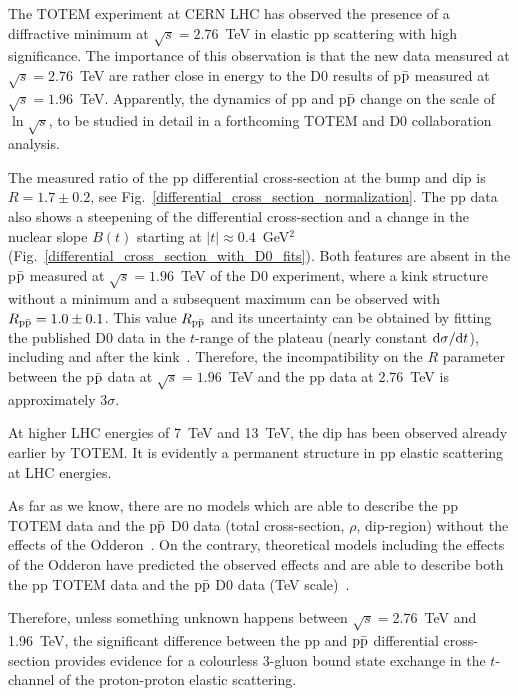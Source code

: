 \documentclass[TOTEM]{cernphprep}
\begin{document}
The TOTEM experiment at CERN LHC has observed the presence of a diffractive minimum at $\sqrt{s}=2.76$~TeV in elastic pp scattering with high significance. The importance of this observation is that the new data measured at $\sqrt{s}=2.76$~TeV
are rather close in energy to the D0 results of p$\bar{\rm p}$ measured at $\sqrt{s}=1.96$~TeV. Apparently, the dynamics of pp and p$\rm\bar{p}$ change on the scale of $\ln{\sqrt{s}}$, to be studied in detail in
a forthcoming TOTEM and D0 collaboration analysis. 

The measured ratio of the pp differential cross-section at the bump and dip is $R=1.7 \pm 0.2$, see Fig.~\ref{differential_cross_section_normalization}. The pp data also shows a steepening of the differential
cross-section and a change in the nuclear slope $B(t)$ starting at $|t|\approx0.4$~GeV$^{2}$ (Fig.~\ref{differential_cross_section_with_D0_fits}). Both features are 
absent in the p$\bar{\rm p}$ measured at $\sqrt{s}=1.96$~TeV of the D0 experiment, where a kink structure without a minimum and a subsequent maximum can be observed with $R_{\rm p\bar{p}}=1.0\pm 0.1$. This value $R_{\rm p\bar{p}}$ and its uncertainty
can be obtained by fitting the published D0 data in the $t$-range of the plateau (nearly constant ${\rm d}\sigma/{\rm d}t$), including and after the kink~\cite{Abazov:2012qb}. Therefore, the incompatibility on the $R$ parameter between the p$\bar{\rm p}$ data at $\sqrt{s}=1.96$~TeV
and the pp data at 2.76~TeV is approximately 3$\sigma$.


At higher LHC energies of 7~TeV and 13~TeV, the dip has been observed already earlier by TOTEM. It is evidently a permanent structure in pp elastic scattering 
at LHC energies.

As far as we know, there are no models which are able to describe the pp TOTEM data and the $\rm p\bar{p}$ D0 data (total cross-section,
$\rho$, dip-region) without the effects of the Odderon~\cite{Cudell:2002xe,Khoze:2017swe,Khoze:2013jsa}. On the contrary, theoretical models including the effects of the Odderon have predicted the observed effects and are able to describe both the pp TOTEM data and the $\rm p\bar{p}$ D0 data (TeV scale)~\cite{Lukaszuk:1973nt,Martynov:2017zjz,Gauron:1992zc}.

Therefore, unless something unknown happens between $\sqrt{s}=$2.76~TeV and 1.96~TeV, the significant difference between the pp and $\rm p\bar{p}$ differential cross-section provides evidence for a colourless
3-gluon bound state exchange in the $t$-channel of the proton-proton elastic scattering.
\end{document}
